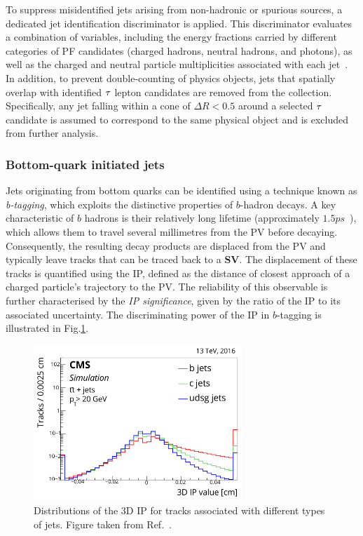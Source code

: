 To suppress misidentified jets arising from non-hadronic or spurious sources, a dedicated jet identification discriminator is applied. This discriminator evaluates a combination of variables, including the energy fractions carried by different categories of \ac{PF} candidates (charged hadrons, neutral hadrons, and photons), as well as the charged and neutral particle multiplicities associated with each jet~\cite{Jet_Algorithm_Performance}. In addition, to prevent double-counting of physics objects, jets that spatially overlap with identified $\tau$ lepton candidates are removed from the collection. Specifically, any jet falling within a cone of $\Delta R < 0.5$ around a selected $\tau$ candidate is assumed to correspond to the same physical object and is excluded from further analysis.

\subsubsection{Bottom-quark initiated jets}

Jets originating from bottom quarks can be identified using a technique known as \textit{b-tagging}, which exploits the distinctive properties of $b$-hadron decays. A key characteristic of $b$ hadrons is their relatively long lifetime (approximately $1.5\unit{ps}$~\cite{ParticleMasses}), which allows them to travel several millimetres from the \ac{PV} before decaying. Consequently, the resulting decay products are displaced from the \ac{PV} and typically leave tracks that can be traced back to a \textbf{\ac{SV}}. The displacement of these tracks is quantified using the \ac{IP}, defined as the distance of closest approach of a charged particle’s trajectory to the \ac{PV}. The reliability of this observable is further characterised by the \textit{\ac{IP} significance}, given by the ratio of the \ac{IP} to its associated uncertainty. The discriminating power of the \ac{IP} in $b$-tagging is illustrated in Fig.\ref{Figure:Chapter4_IP_bjets}.

\begin{figure}[h]
\centering
\includegraphics[width=0.7\textwidth]{Figures/Chapter4/IP_bjets.pdf}
\caption[Distributions of the 3D impact parameter for tracks associated with different types of jets]{Distributions of the 3D \ac{IP} for tracks associated with different types of jets. Figure taken from Ref.~\cite{HeavyFlavourJets_ID}.}
\label{Figure:Chapter4_IP_bjets}
\end{figure}

